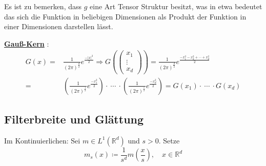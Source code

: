 \documentclass[ngerman]{article}
\theoremstyle{plain}
\theoremstyle{definition}
\numberwithin{equation}{section}
\newcommand{\abs}[1] {
\left| #1 \right|
}
\newcommand{\R}[0] {
\mathbb R
}
\newcommand{\srmatrix}[1] {
\left( \begin{smallmatrix} #1 \end{smallmatrix} \right)
}
\newcommand{\mim}[1] {
\underline{\textbf{#1\index{#1}}}
}
\newcommand{\x}[0] {
  \boldsymbol{x}
}
\begin{document}
    Es ist zu bemerken, dass $g$ eine Art Tensor Struktur besitzt, was in etwa bedeutet das sich die Funktion in beliebigen Dimensionen als Produkt der Funktion in einer Dimensionen darstellen lässt.

    \mim{Gauß-Kern}:
    \begin{align*}
        G(x) =& \frac{1}{(2 \pi)^{\frac{d}{2}}} e^{\frac{-\abs{x}^2}{2}} \Rightarrow G\left( \srmatrix{x_1\\\vdots\\x_d} \right) = \frac{1}{(2 \pi)^{\frac{d}{2}}} e^{\frac{-x_1^2-x_2^2 + \cdots + x_d^2}{2}}\\
        =& \left( \frac{1}{(2 \pi)^\frac{1}{2}} e^{\frac{-x_1^2}{2}}\right) \cdot \ \cdots \ \cdot \left( \frac{1}{(2 \pi)^\frac{1}{2}} e^{\frac{-x_d^2}{2}}\right) = G(x_1) \cdot \ \cdots \ \cdot G(x_d)
    \end{align*}

    \subsection{Filterbreite und Glättung}

    \begin{center}
    \end{center}

    Im Kontinuierlichen: Sei $m \in L^1(\R^d)$ und $s > 0$.
    Setze
        $$ m_s(x)  \coloneqq  \frac{1}{s^d} m (\frac{x}{s}), \quad x\in \R^d$$
\end{document}
